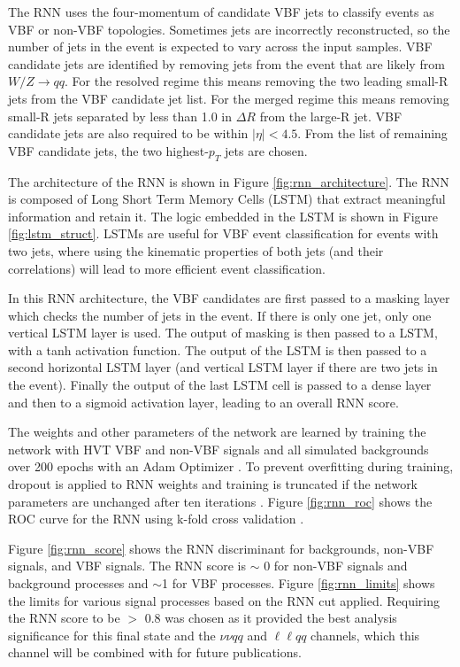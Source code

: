 The RNN uses the four-momentum of candidate VBF jets to classify events as VBF or non-VBF topologies. Sometimes jets are incorrectly reconstructed, so the number of jets in the event is expected to vary across the input samples. VBF candidate jets are identified by removing jets from the event that are likely from $W/Z \rightarrow qq$. For the resolved regime this means removing the two leading small-R jets from the VBF candidate jet list. For the merged regime this means removing small-R jets separated by less than 1.0 in $\Delta R$ from the large-R jet. VBF candidate jets are also required to be within $|\eta| < 4.5$. From the list of remaining VBF candidate jets, the two highest-$p_{T}$ jets are chosen. 

The architecture of the RNN is shown in Figure \ref{fig:rnn_architecture}. The RNN is composed of Long Short Term Memory Cells (LSTM) that extract meaningful information and retain it. The logic embedded in the LSTM is shown in Figure \ref{fig:lstm_struct}. LSTMs are useful for VBF event classification for events with two jets, where using the kinematic properties of both jets (and their correlations) will lead to more efficient event classification.

In this RNN architecture, the VBF candidates are first passed to a masking layer which checks the number of jets in the event. If there is only one jet, only one vertical LSTM layer is used. The output of masking is then passed to a LSTM, with a tanh activation function. The output of the LSTM is then passed to a second horizontal LSTM layer (and vertical LSTM layer if there are two jets in the event). Finally the output of the last LSTM cell is passed to a dense layer and then to a sigmoid activation layer, leading to an overall RNN score.

The weights and other parameters of the network are learned by training the network with HVT VBF and non-VBF signals and all simulated backgrounds over 200 epochs with an Adam Optimizer \cite{adamopt}. To prevent overfitting during training, dropout is applied to RNN weights and training is truncated if the network parameters are unchanged after ten iterations \cite{rnndropout}. Figure \ref{fig:rnn_roc} shows the ROC curve for the RNN using k-fold cross validation \cite{kfold}. 

 Figure \ref{fig:rnn_score} shows the RNN discriminant for backgrounds, non-VBF signals, and VBF signals. The RNN score is $\sim$ 0 for non-VBF signals and background processes and $\sim$1 for VBF processes. Figure \ref{fig:rnn_limits} shows the limits for various signal processes based on the RNN cut applied. Requiring the RNN score to be $>$ 0.8 was chosen as it provided the best analysis significance for this final state and the $\nu\nu qq$ and $\ell \ell qq$ channels, which this channel will be combined with for future publications.


